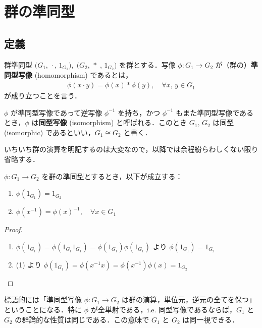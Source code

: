 \documentclass[geometry_main]{subfiles}
\begin{document}
\section{群の準同型}

\subsection{定義}

\begin{mydef}[label=def.hom_group]{群準同型}
	$\bigl(G_1,\, \cdot\mathrel{},\, 1_{G_1}\bigr),\; \bigl(G_2,\, *\;,\, 1_{G_2} \bigr)$ を群とする．写像 $\phi \colon G_1 \to G_2$ が（群の）\textbf{準同型写像} (homomorphism) であるとは，
	\begin{align}
		\phi(x \cdot y) = \phi(x) * \phi(y),\quad \forall x,\, y \in G_1
	\end{align}
	が成り立つことを言う．

	$\phi$ が準同型写像であって逆写像 $\phi^{-1}$ を持ち，かつ $\phi^{-1}$ もまた準同型写像であるとき，$\phi$ は\textbf{同型写像} (isomorphism) と呼ばれる．このとき $G_1,\, G_2$ は同型 (isomorphic) であるといい，\emph{$G_1 \cong G_2$} と書く．
\end{mydef}

いちいち群の演算を明記するのは大変なので，以降では余程紛らわしくない限り省略する．

\begin{myprop}[label=prop.hom_group-1]{}
	$\phi \colon G_1 \to G_2$ を群の準同型とするとき，以下が成立する：
	\begin{enumerate}
		\item $\phi(1_{G_1}) = 1_{G_2}$
		\item $\phi(x^{-1}) = \phi(x)^{-1},\quad \forall x \in G_1$
	\end{enumerate}
\end{myprop}

\begin{proof}
	\begin{enumerate}
		\item $\phi(1_{G_1}) = \phi(1_{G_1} 1_{G_1}) = \phi(1_{G_1}) \phi(1_{G_1})$ より $\phi(1_{G_1}) = 1_{G_2}$
		\item (1) より $\phi(1_{G_1}) = \phi(x^{-1} x) = \phi(x^{-1}) \phi(x) = 1_{G_2}$
	\end{enumerate}
\end{proof}

標語的には「準同型写像 $\phi \colon G_1 \to G_2$ は群の演算，単位元，逆元の全てを保つ」ということになる．特に $\phi$ が全単射である，i.e. 同型写像であるならば，$G_1$ と $G_2$ の群論的な性質は同じである．この意味で $G_1$ と $G_2$ は同一視できる．
\end{document}

